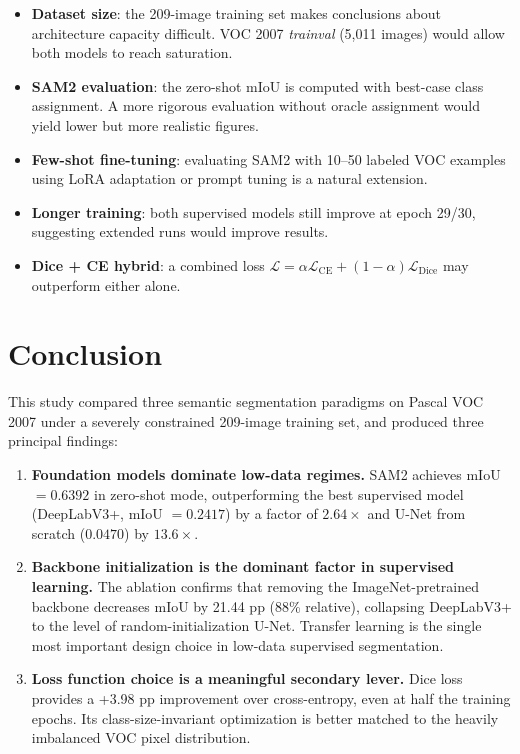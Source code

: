\documentclass[11pt,a4paper]{article}
\begin{document}
\begin{itemize}
  \item \textbf{Dataset size}: the 209-image training set makes conclusions about architecture capacity difficult. VOC 2007 \textit{trainval} (5,011 images) would allow both models to reach saturation.
  \item \textbf{SAM2 evaluation}: the zero-shot mIoU is computed with best-case class assignment. A more rigorous evaluation without oracle assignment would yield lower but more realistic figures.
  \item \textbf{Few-shot fine-tuning}: evaluating SAM2 with 10--50 labeled VOC examples using LoRA adaptation or prompt tuning is a natural extension.
  \item \textbf{Longer training}: both supervised models still improve at epoch 29/30, suggesting extended runs would improve results.
  \item \textbf{Dice + CE hybrid}: a combined loss $\mathcal{L} = \alpha \mathcal{L}_{\text{CE}} + (1{-}\alpha) \mathcal{L}_{\text{Dice}}$ may outperform either alone.
\end{itemize}

\section{Conclusion}

This study compared three semantic segmentation paradigms on Pascal VOC 2007 under a severely constrained 209-image training set, and produced three principal findings:

\begin{enumerate}
  \item \textbf{Foundation models dominate low-data regimes.} SAM2 achieves mIoU $= 0.6392$ in zero-shot mode, outperforming the best supervised model (DeepLabV3+, mIoU $= 0.2417$) by a factor of $2.64\times$ and U-Net from scratch ($0.0470$) by $13.6\times$.

  \item \textbf{Backbone initialization is the dominant factor in supervised learning.} The ablation confirms that removing the ImageNet-pretrained backbone decreases mIoU by 21.44 pp (88\% relative), collapsing DeepLabV3+ to the level of random-initialization U-Net. Transfer learning is the single most important design choice in low-data supervised segmentation.

  \item \textbf{Loss function choice is a meaningful secondary lever.} Dice loss provides a +3.98 pp improvement over cross-entropy, even at half the training epochs. Its class-size-invariant optimization is better matched to the heavily imbalanced VOC pixel distribution.
\end{enumerate}
\end{document}
